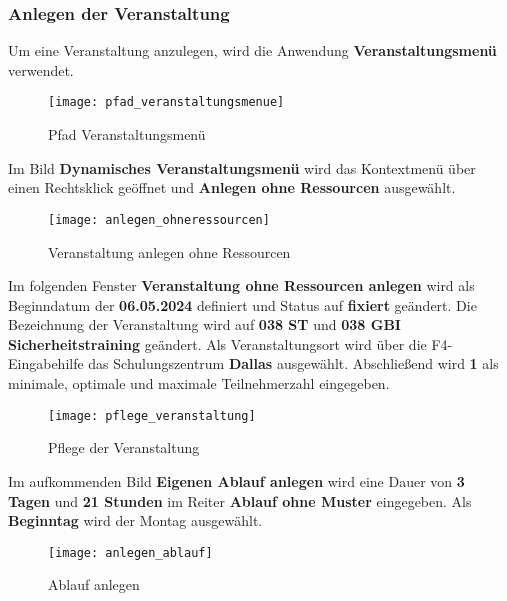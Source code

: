 \subsubsection{Anlegen der Veranstaltung}
Um eine Veranstaltung anzulegen, wird die Anwendung \textbf{Veranstaltungsmenü} verwendet.
\begin{figure}[H]
	\centering
	\texttt{[image: pfad\_veranstaltungsmenue]}
	\caption{Pfad Veranstaltungsmenü}
	\label{fig:pfad_veranstaltungsmenue}
\end{figure}
Im Bild \textbf{Dynamisches Veranstaltungsmenü} wird das Kontextmenü über einen Rechtsklick geöffnet und \textbf{Anlegen ohne Ressourcen} ausgewählt.
\begin{figure}[H]
	\centering
	\texttt{[image: anlegen\_ohneressourcen]}
	\caption{Veranstaltung anlegen ohne Ressourcen}
	\label{fig:anlegen_ohneressourcen}
\end{figure}
Im folgenden Fenster \textbf{Veranstaltung ohne Ressourcen anlegen} wird als Beginndatum der \textbf{06.05.2024} definiert und Status auf \textbf{fixiert} geändert. Die Bezeichnung der Veranstaltung wird auf \textbf{038 ST} und \textbf{038 GBI Sicherheitstraining} geändert. Als Veranstaltungsort wird über die F4-Eingabehilfe das Schulungszentrum \textbf{Dallas} ausgewählt. Abschließend wird \textbf{1} als minimale, optimale und maximale Teilnehmerzahl eingegeben.
\begin{figure}[H]
	\centering
	\texttt{[image: pflege\_veranstaltung]}
	\caption{Pflege der Veranstaltung}
	\label{fig:pflege_veranstaltung}
\end{figure}
Im aufkommenden Bild \textbf{Eigenen Ablauf anlegen} wird eine Dauer von \textbf{3 Tagen} und \textbf{21 Stunden} im Reiter \textbf{Ablauf ohne Muster} eingegeben. Als \textbf{Beginntag} wird der Montag ausgewählt.
\begin{figure}[H]
	\centering
	\texttt{[image: anlegen\_ablauf]}
	\caption{Ablauf anlegen}
	\label{fig:anlegen_ablauf}
\end{figure}

